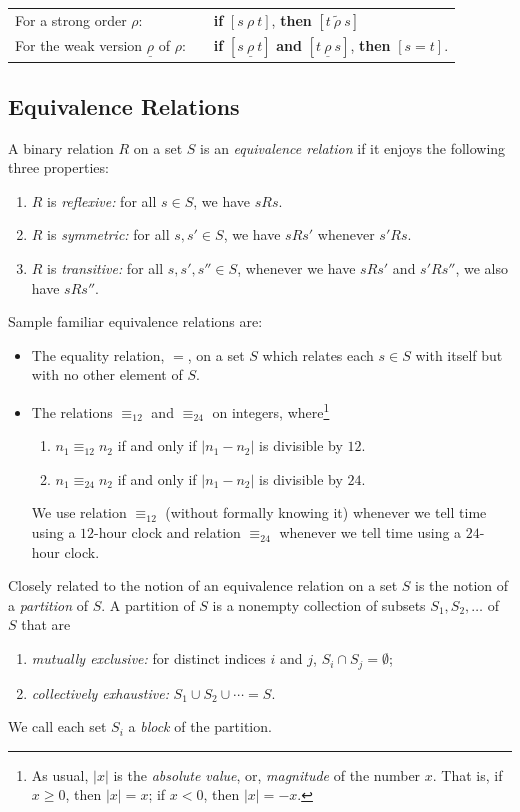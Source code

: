 \smallskip

\begin{tabular}{lll}
For a strong order $\rho$: & &
{\bf if} $[s \ \rho \ t]$, {\bf then} $[t \ \widetilde{\rho} \ s]$ \\
For the weak version $\underline{\rho}$ of $\rho$: & &
{\bf if} $[s \ \underline{\rho} \ t]$ {\bf and} $[t \ \underline{\rho}
  \ s]$, {\bf then} $[s = t]$.
\end{tabular}

\subsection{Equivalence Relations}
\label{sec:equiv-relation}

A binary relation $R$ on a set $S$ is an {\it equivalence
  relation} if it enjoys the following
three properties:
\begin{enumerate}
\item
$R$ is {\em reflexive:} for all $s \in S$, we have $sRs$.
\item
$R$ is {\em symmetric:} for all $s, s' \in S$, we have $sRs'$ whenever
  $s'Rs$.
\item
$R$ is {\em transitive:} for all $s, s', s'' \in S$, whenever we have
  $sRs'$ and $s'Rs''$, we also have $sRs''$.
\end{enumerate}
Sample familiar  equivalence relations are:
\begin{itemize}
\item
The equality relation, $=$, on a set $S$ which relates each $s \in S$
with itself but with no other element of $S$.
\item
The relations $\equiv_{12}$ and $\equiv_{24}$ on integers,
where\footnote{As usual, $|x|$ is the {\em absolute value}, or, {\em
    magnitude} of the number $x$.  That is, if $x \geq 0$, then $|x| =
  x$; if $x < 0$, then $|x| = -x$.}
  \begin{enumerate}
  \item
$n_1 \equiv_{12} n_2$ if and only if $|n_1 - n_2|$ is divisible by
$12$.
  \item
$n_1 \equiv_{24} n_2$ if and only if $|n_1 - n_2|$ is divisible by
$24$.
  \end{enumerate}
We use relation $\equiv_{12}$ (without formally knowing it) whenever
we tell time using a $12$-hour clock and relation $\equiv_{24}$
whenever we tell time using a $24$-hour clock.
\end{itemize}

Closely related to the notion of an equivalence relation on a set $S$
is the notion of a {\it partition} of $S$.  A partition of $S$ is a
nonempty collection of subsets $S_1, S_2, \ldots$ of $S$ that are
\begin{enumerate}
\item
{\em mutually exclusive:}
for distinct indices $i$ and $j$, $S_i \cap S_j = \emptyset$;
\item
{\em collectively exhaustive:}
$S_1 \cup S_2 \cup \cdots = S$.
\end{enumerate}
We call each set $S_i$ a {\it block} of the partition.

